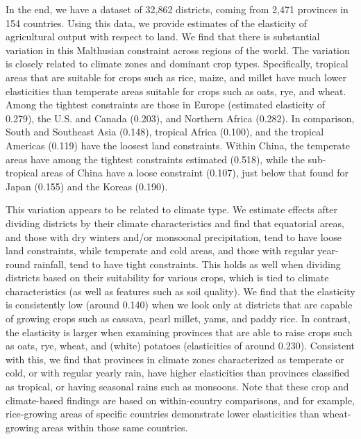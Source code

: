 \documentclass[11pt]{article}
\begin{document}
In the end, we have a dataset of 32,862 districts, coming from 2,471 provinces in 154 countries. Using this data, we provide estimates of the elasticity of agricultural output with respect to land. We find that there is substantial variation in this Malthusian constraint across regions of the world. The variation is closely related to climate zones and dominant crop types. Specifically, tropical areas that are suitable for crops such as rice, maize, and millet have much lower elasticities than temperate areas suitable for crops such as oats, rye, and wheat. Among the tightest constraints are those in Europe (estimated elasticity of 0.279), the U.S. and Canada (0.203), and Northern Africa (0.282). In comparison, South and Southeast Asia (0.148), tropical Africa (0.100), and the tropical Americas (0.119) have the loosest land constraints. Within China, the temperate areas have among the tightest constraints estimated (0.518), while the sub-tropical areas of China have a loose constraint (0.107), just below that found for Japan (0.155) and the Koreas (0.190). 

This variation appears to be related to climate type. We estimate effects after dividing districts by their climate characteristics and find that equatorial areas, and those with dry winters and/or monsoonal precipitation, tend to have loose land constraints, while temperate and cold areas, and those with regular year-round rainfall, tend to have tight constraints. This holds as well when dividing districts based on their suitability for various crops, which is tied to climate characteristics (as well as features such as soil quality). We find that the elasticity is consistently low (around 0.140) when we look only at districts that are capable of growing crops such as cassava, pearl millet, yams, and paddy rice. In contrast, the elasticity is larger when examining provinces that are able to raise crops such as oats, rye, wheat, and (white) potatoes (elasticities of around 0.230). Consistent with this, we find that provinces in climate zones characterized as temperate or cold, or with regular yearly rain, have higher elasticities than provinces classified as tropical, or having seasonal rains such as monsoons. Note that these crop and climate-based findings are based on within-country comparisons, and for example, rice-growing areas of specific countries demonstrate lower elasticities than wheat-growing areas within those same countries.
\end{document}
